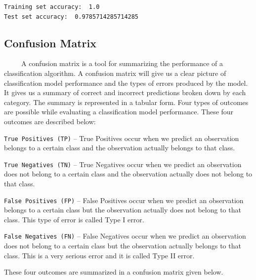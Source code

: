 \documentclass[
  letterpaper,
  DIV=11,
  numbers=noendperiod]{scrreprt}
\begin{document}
\begin{verbatim}
Training set accuracy:  1.0
Test set accuracy:  0.9785714285714285
\end{verbatim}

\subsection{Confusion Matrix}\label{confusion-matrix}

~~~~~A confusion matrix is a tool for summarizing the performance of a
classification algorithm. A confusion matrix will give us a clear
picture of classification model performance and the types of errors
produced by the model. It gives us a summary of correct and incorrect
predictions broken down by each category. The summary is represented in
a tabular form. Four types of outcomes are possible while evaluating a
classification model performance. These four outcomes are described
below:

\texttt{True\ Positives\ (TP)} -- True Positives occur when we predict
an observation belongs to a certain class and the observation actually
belongs to that class.

\texttt{True\ Negatives\ (TN)} -- True Negatives occur when we predict
an observation does not belong to a certain class and the observation
actually does not belong to that class.

\texttt{False\ Positives\ (FP)} -- False Positives occur when we predict
an observation belongs to a certain class but the observation actually
does not belong to that class. This type of error is called Type I
error.

\texttt{False\ Negatives\ (FN)} -- False Negatives occur when we predict
an observation does not belong to a certain class but the observation
actually belongs to that class. This is a very serious error and it is
called Type II error.

These four outcomes are summarized in a confusion matrix given below.
\end{document}
